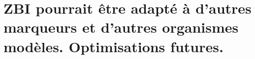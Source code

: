 \documentclass[\main/main.tex]{subfiles}
\begin{document}
\chapter{ZBI pourrait être adapté à d'autres marqueurs et d'autres organismes modèles. Optimisations futures.}






\end{document}
